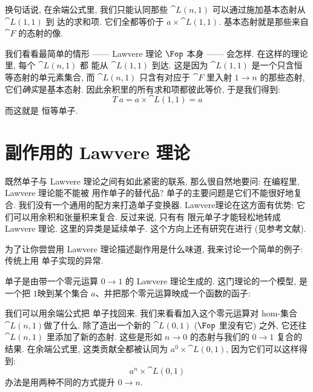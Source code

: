 换句话说, 在余端公式里, 我们只能认同那些 $\cat{L}(n, 1)$ 可以通过施加基本态射从 $\cat{L}(1, 1)$ 到
达的求和项. 它们全都等价于 $a \times \cat{L}(1, 1)$. 基本态射就是那些来自 $\cat{F}$ 的态射的像.

我们看看最简单的情形 —— Lawvere 理论 $\Fop$ 本身 —— 会怎样. 在这样的理论里, 每个 $\cat{L}(n, 1)$ 都
能从 $\cat{L}(1, 1)$ 到达. 这是因为 $\cat{L}(1, 1)$ 是一个只含恒等态射的单元素集合, 而
$\cat{L}(n, 1)$ 只含有对应于 $\cat{F}$ 里入射 $1 \to n$ 的那些态射, 它们\emph{确实}是基本态射.
因此余积里的所有求和项都彼此等价, 于是我们得到: \[T\ a = a \times \cat{L}(1, 1) = a\] 而这就是
恒等单子.

\section{副作用的 Lawvere 理论}

既然单子与 Lawvere 理论之间有如此紧密的联系, 那么很自然地要问: 在编程里, Lawvere 理论能不能被
用作单子的替代品? 单子的主要问题是它们不能很好地复合. 我们没有一个通用的配方来打造单子变换器.
Lawvere理论在这方面有优势: 它们可以用余积和张量积来复合. 反过来说, 只有有
限元单子才能轻松地转成Lawvere 理论. 这里的异类是延续单子. 这个方向上还有研究在进行 (见参考文献).

为了让你尝尝用 Lawvere 理论描述副作用是什么味道, 我来讨论一个简单的例子: 传统上用 
单子实现的异常.

 单子是由带一个零元运算 $0 \to 1$ 的 Lawvere 理论生成的. 这门理论的一个模型, 是一个把
$1$映到某个集合 $a$、并把那个零元运算映成一个函数的函子:

 我们可以用余端公式把  单子找回来. 我们来看看加入这个零元运算对
hom-集合$\cat{L}(n, 1)$做了什么. 除了造出一个新的 $\cat{L}(0, 1)$ ($\Fop$ 里没有它) 之外,
它还往$\cat{L}(n, 1)$ 里添加了新的态射. 这些是形如 $n \to 0$ 的态射与我们的 $0 \to 1$ 复合的结果.
在余端公式里, 这类贡献全都被认同为 $a^0 \times \cat{L}(0, 1)$, 因为它们可以这样得到:
\[a^n \times \cat{L}(0, 1)\] 办法是用两种不同的方式提升 $0 \to n$.

\begin{figure}[H]
  \centering
\end{figure}

